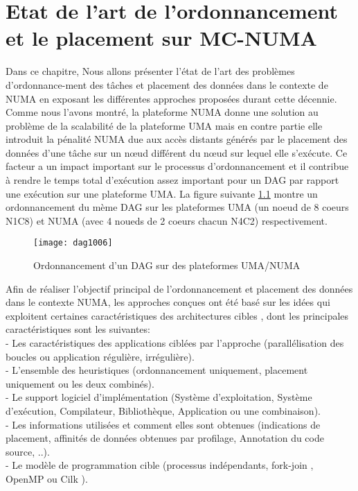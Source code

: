 ﻿\chapter{Etat de l'art de l'ordonnancement et le  placement sur MC-NUMA} \label{chapter:opdag} 
%
Dans ce chapitre, Nous allons présenter l'état de l'art des problèmes d'ordonnance-ment des tâches et placement des données dans le contexte de NUMA en exposant les différentes approches proposées durant cette décennie. Comme nous l'avons montré, la plateforme NUMA donne une solution au problème de la scalabilité de la plateforme UMA mais en contre partie elle introduit la pénalité NUMA due aux accès distants générés par le placement des données d'une tâche sur un nœud différent du nœud sur lequel elle s'exécute. Ce facteur a un impact important sur le processus d'ordonnancement et il contribue à rendre le temps total d'exécution assez important pour un DAG par rapport  %
une exécution sur une plateforme UMA.
La figure suivante \ref{fig:FG_2_dag1006} montre un ordonnancement du mème DAG sur les plateformes UMA (un noeud de 8 coeurs N1C8) et NUMA (avec 4 noueds de 2 coeurs chacun N4C2) respectivement.
%
\begin{figure}
\texttt{[image: dag1006]}
\centering
\caption{Ordonnancement d'un DAG sur des plateformes UMA/NUMA}
\label{fig:FG_2_dag1006}
\end{figure}
%
Afin de réaliser l'objectif principal de l'ordonnancement et placement des données dans le contexte NUMA, les approches conçues ont été basé sur les idées qui exploitent certaines caractéristiques des architectures cibles \cite{Dreb15},
dont les principales caractéristiques sont les suivantes: \\  
- Les caractéristiques des applications ciblées par l'approche (parallélisation des boucles ou application régulière, irrégulière). \\
- L'ensemble des heuristiques (ordonnancement uniquement, placement uniquement ou les deux combinés). \\
- Le support logiciel d'implémentation (Système d'exploitation, Système d'exécution, Compilateur, Bibliothèque, Application ou une combinaison). \\
- Les informations utilisées et comment elles sont obtenues (indications de placement, affinités de données obtenues par profilage, Annotation du code source, ..).\\
- Le modèle de programmation cible (processus indépendants, fork-join \cite{FJ11} ,  OpenMP \cite{Omp00} \cite{Omp01} \cite{Omp02} ou Cilk \cite{Cil00} \cite{Cil01}).

